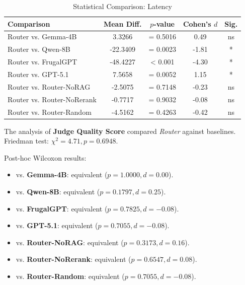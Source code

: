 \begin{table}[H]
\centering
\caption{Statistical Comparison: Latency}
\label{tab:stats_latency}
\begin{tabular}{lcccc}
\toprule
\textbf{Comparison} & \textbf{Mean Diff.} & \textbf{$p$-value} & \textbf{Cohen's $d$} & \textbf{Sig.} \\ \midrule
Router vs. Gemma-4B & 3.3266 & = 0.5016 & 0.49 & ns \\ 
Router vs. Qwen-8B & -22.3409 & = 0.0023 & -1.81 & * \\ 
Router vs. FrugalGPT & -48.4227 & < 0.001 & -4.30 & * \\ 
Router vs. GPT-5.1 & 7.5658 & = 0.0052 & 1.15 & * \\ 
Router vs. Router-NoRAG & -2.5075 & = 0.7148 & -0.23 & ns \\ 
Router vs. Router-NoRerank & -0.7717 & = 0.9032 & -0.08 & ns \\ 
Router vs. Router-Random & -4.5162 & = 0.4263 & -0.42 & ns \\ 
\bottomrule
\end{tabular}
\end{table}


The analysis of \textbf{Judge Quality Score} compared \textit{Router} against baselines. 
Friedman test: $\chi^2 = 4.71, p = 0.6948$.

Post-hoc Wilcoxon results:
\begin{itemize}
    \item vs. \textbf{Gemma-4B}: equivalent ($p = 1.0000, d=0.00$).
    \item vs. \textbf{Qwen-8B}: equivalent ($p = 0.1797, d=0.25$).
    \item vs. \textbf{FrugalGPT}: equivalent ($p = 0.7825, d=-0.08$).
    \item vs. \textbf{GPT-5.1}: equivalent ($p = 0.7055, d=-0.08$).
    \item vs. \textbf{Router-NoRAG}: equivalent ($p = 0.3173, d=0.16$).
    \item vs. \textbf{Router-NoRerank}: equivalent ($p = 0.6547, d=0.08$).
    \item vs. \textbf{Router-Random}: equivalent ($p = 0.7055, d=-0.08$).
\end{itemize}

